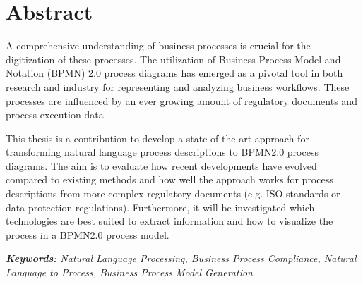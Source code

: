 \chapter*{Abstract}
\noindent
A comprehensive understanding of business processes is crucial for the digitization of these processes. The utilization of Business Process Model and Notation (BPMN) 2.0 process diagrams has emerged as a pivotal tool in both research and industry for representing and analyzing business workflows. These processes are influenced by an ever growing amount of regulatory documents and process execution data.

This thesis is a contribution to develop a state-of-the-art approach for transforming natural language process descriptions to BPMN2.0 process diagrams. The aim is to evaluate how recent developments have evolved compared to existing methods and how well the approach works for process descriptions from more complex regulatory documents (e.g. ISO standards or data protection regulations). Furthermore, it will be investigated which technologies are best suited to extract information and how to visualize the process in a BPMN2.0 process model.

\textit{\textbf{Keywords: }Natural Language Processing, Business Process Compliance, Natural Language to Process, Business Process Model Generation}
